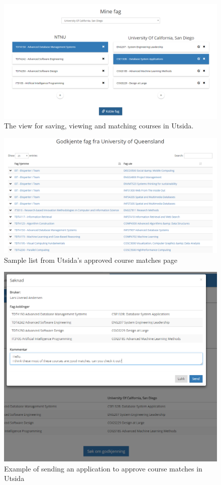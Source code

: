 \begin{figure}
    \centering
    \includegraphics[width=1\textwidth]{fig/utsida_screenshots/course_match.png}
    \caption{The view for saving, viewing and matching courses in Utsida.}
    \label{fig:my_label}
\end{figure}
\begin{figure}
    \centering
    \includegraphics[width=1\textwidth]{fig/utsida_screenshots/approved_courses.PNG}
    \caption{Sample list from Utsida's approved course matches page}
    \label{fig:my_label}
\end{figure}
\begin{figure}
    \centering
    \includegraphics[width=1\textwidth]{fig/utsida_screenshots/application.PNG}
    \caption{Example of sending an application to approve course matches in Utsida}
    \label{fig:my_label}
\end{figure}

